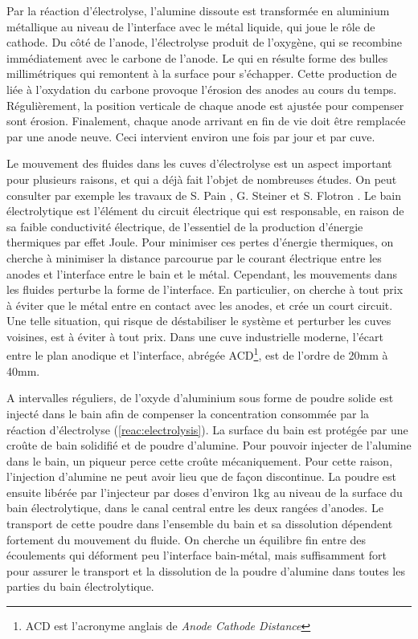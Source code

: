 Par la réaction d'électrolyse, l'alumine dissoute est transformée en
aluminium métallique au niveau de l'interface avec le métal liquide,
qui joue le rôle de cathode. Du côté de l'anode, l'électrolyse produit
de l'oxygène, qui se recombine immédiatement avec le carbone de
l'anode. Le  qui en résulte forme des bulles millimétriques
qui remontent à la surface pour s'échapper. Cette production de
 liée à l'oxydation du carbone provoque l'érosion des anodes
au cours du temps. Régulièrement, la position verticale de chaque
anode est ajustée pour compenser sont érosion. Finalement, chaque
anode arrivant en fin de vie doit être remplacée par une anode
neuve. Ceci intervient environ une fois par jour et par cuve.

Le mouvement des fluides dans les cuves d'électrolyse est un aspect
important pour plusieurs raisons, et qui a déjà fait l'objet de
nombreuses études. On peut consulter par exemple les travaux de
S. Pain \cite{Pain2006}, G. Steiner \cite{Steiner2009} et S. Flotron
\cite{Flotron2013}. Le bain électrolytique est l'élément du circuit
électrique qui est responsable, en raison de sa faible conductivité
électrique, de l'essentiel de la production d'énergie thermiques par
effet Joule. Pour minimiser ces pertes d'énergie thermiques, on
cherche à minimiser la distance parcourue par le courant électrique
entre les anodes et l'interface entre le bain et le métal. Cependant,
les mouvements dans les fluides perturbe la forme de l'interface. En
particulier, on cherche à tout prix à éviter que le métal entre en
contact avec les anodes, et crée un court circuit. Une telle
situation, qui risque de déstabiliser le système et perturber les
cuves voisines, est à éviter à tout prix. Dans une cuve industrielle
moderne, l'écart entre le plan anodique et l'interface, abrégée
ACD\footnote{ACD est l'acronyme anglais de {\em Anode Cathode
    Distance}}, est de l'ordre de \num{20}\si{\milli\meter} à
\num{40}\si{\milli\meter}.

A intervalles réguliers, de l'oxyde d'aluminium sous forme de poudre
solide est injecté dans le bain afin de compenser la concentration
consommée par la réaction d'électrolyse (\ref{reac:electrolysis}).  La
surface du bain est protégée par une croûte de bain solidifié et de
poudre d'alumine. Pour pouvoir injecter de l'alumine dans le bain, un
piqueur perce cette croûte mécaniquement. Pour cette raison,
l'injection d'alumine ne peut avoir lieu que de façon discontinue.  La
poudre est ensuite libérée par l'injecteur par doses d'environ
\num{1}\si{\kilo\gram} au niveau de la surface du bain électrolytique,
dans le canal central entre les deux rangées d'anodes. Le transport de
cette poudre dans l'ensemble du bain et sa dissolution dépendent
fortement du mouvement du fluide. On cherche un équilibre fin entre
des écoulements qui déforment peu l'interface bain-métal, mais
suffisamment fort pour assurer le transport et la dissolution de la
poudre d'alumine dans toutes les parties du bain électrolytique.


